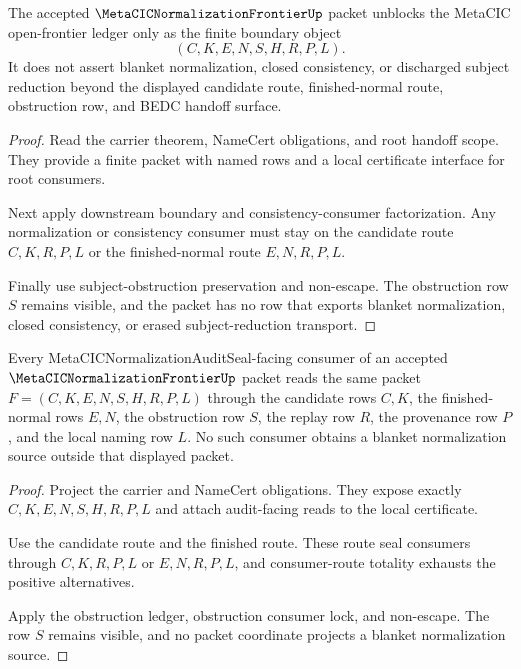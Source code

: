 \begin{theorem}
\label{thm:metacic-normalization-frontier-open-problem-ledger-unblock}
The accepted $\MetaCICNormalizationFrontierUp$ packet unblocks the MetaCIC
open-frontier ledger only as the finite boundary object
$$
(C,K,E,N,S,H,R,P,L).
$$
It does not assert blanket normalization, closed consistency, or discharged
subject reduction beyond the displayed candidate route, finished-normal route,
obstruction row, and BEDC handoff surface.
\end{theorem}
\begin{proof}
Read the carrier theorem, NameCert obligations, and root handoff scope. They
provide a finite packet with named rows and a local certificate interface for
root consumers.

Next apply downstream boundary and consistency-consumer factorization. Any
normalization or consistency consumer must stay on the candidate route
$C,K,R,P,L$ or the finished-normal route $E,N,R,P,L$.

Finally use subject-obstruction preservation and non-escape. The obstruction
row $S$ remains visible, and the packet has no row that exports blanket
normalization, closed consistency, or erased subject-reduction transport.
\end{proof}

\begin{theorem}
\label{thm:metacic-normalization-frontier-audit-seal-consumer-route}
Every MetaCICNormalizationAuditSeal-facing consumer of an accepted
$\MetaCICNormalizationFrontierUp$ packet reads the same packet
$F=(C,K,E,N,S,H,R,P,L)$ through the candidate rows $C,K$, the finished-normal
rows $E,N$, the obstruction row $S$, the replay row $R$, the provenance row
$P$, and the local naming row $L$. No such consumer obtains a blanket
normalization source outside that displayed packet.
\end{theorem}
\begin{proof}
Project the carrier and NameCert obligations. They expose exactly
$C,K,E,N,S,H,R,P,L$ and attach audit-facing reads to the local certificate.

Use the candidate route and the finished route. These route seal consumers
through $C,K,R,P,L$ or $E,N,R,P,L$, and consumer-route totality exhausts the
positive alternatives.

Apply the obstruction ledger, obstruction consumer lock, and non-escape. The
row $S$ remains visible, and no packet coordinate projects a blanket
normalization source.
\end{proof}

